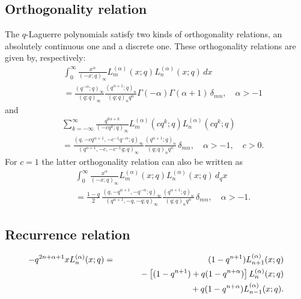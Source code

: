 \documentclass[envcountchap,graybox]{svmono}
\newcommand{\mathindent}{\hspace{7.5mm}}
\renewcommand{\Gamma}{\varGamma}
\begin{document}
\subsection*{Orthogonality relation}
The $q$-Laguerre polynomials satisfy two kinds of orthogonality relations, an absolutely
continuous one and a discrete one. These orthogonality relations are given by, respectively:
\begin{eqnarray}
\label{OrtqLaguerre1}
& &\int_{0}^{\infty}\frac{x^{\alpha}}{(-x;q)_{\infty}}L_m^{(\alpha)}(x;q)L_n^{(\alpha)}(x;q)\,dx\nonumber\\
& &{}=\frac{(q^{-\alpha};q)_{\infty}}{(q;q)_{\infty}}
\frac{(q^{\alpha+1};q)_n}{(q;q)_nq^n}\Gamma(-\alpha)\Gamma(\alpha+1)\,\delta_{mn},\quad\alpha>-1
\end{eqnarray}
and
\begin{eqnarray}
\label{OrtqLaguerre2}
& &\sum_{k=-\infty}^{\infty}\frac{q^{k\alpha+k}}{(-cq^k;q)_{\infty}}L_m^{(\alpha)}(cq^k;q)L_n^{(\alpha)}(cq^k;q)\nonumber\\
& &{}=\frac{(q,-cq^{\alpha+1},-c^{-1}q^{-\alpha};q)_{\infty}}
{(q^{\alpha+1},-c,-c^{-1}q;q)_{\infty}}\frac{(q^{\alpha+1};q)_n}{(q;q)_nq^n}\,\delta_{mn},
\quad\alpha>-1,\quad c>0.
\end{eqnarray}
For $c=1$ the latter orthogonality relation can also be written as
\begin{eqnarray}
\label{OrtqLaguerre3}
& &\int_0^{\infty}\frac{x^{\alpha}}{(-x;q)_{\infty}}L_m^{(\alpha)}(x;q)L_n^{(\alpha)}(x;q)\,d_qx\nonumber\\
& &{}=\frac{1-q}{2}\,\frac{(q,-q^{\alpha+1},-q^{-\alpha};q)_{\infty}}
{(q^{\alpha+1},-q,-q;q)_{\infty}}\frac{(q^{\alpha+1};q)_n}{(q;q)_nq^n}\,\delta_{mn},\quad\alpha>-1.
\end{eqnarray}

\newpage

\subsection*{Recurrence relation}
\begin{eqnarray}
\label{RecqLaguerre}
-q^{2n+\alpha+1}xL_n^{(\alpha)}(x;q)&=&(1-q^{n+1})L_{n+1}^{(\alpha)}(x;q)\nonumber\\
& &{}\mathindent{}-\left[(1-q^{n+1})+q(1-q^{n+\alpha})\right]L_n^{(\alpha)}(x;q)\nonumber\\
& &{}\mathindent\mathindent{}+q(1-q^{n+\alpha})L_{n-1}^{(\alpha)}(x;q).
\end{eqnarray}
\end{document}
